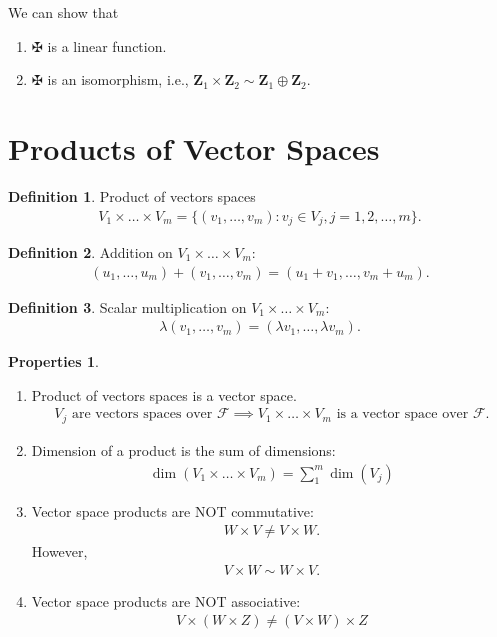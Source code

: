 \documentclass{book}
\theoremstyle{definition}
\newtheorem{defn}{Definition}[section]
\newtheorem{prop}{Properties}[section]
\newcommand{\F}{\mathcal{F}}
\newcommand{\Z}{\mathbf{Z}}
\begin{document}
We can show that
\begin{enumerate}
	\item $\maltese$ is a linear function. 
	
	\item $\maltese$ is an isomorphism, i.e., $\Z_1 \times \Z_2 \sim \Z_1 \oplus \Z_2$.
\end{enumerate}






\section{Products of Vector Spaces}




\begin{defn}
	Product of vectors spaces
	\begin{align*}
	V_1 \times\dots\times V_m = \{ (v_1,\dots,v_m): v_j \in V_j, j=1,2,\dots,m\}.
	\end{align*}
\end{defn}
\begin{defn}
	Addition on $V_1 \times\dots\times V_m$:
	\begin{align*}
	(u_1,\dots,u_m) + (v_1,\dots,v_m) = (u_1+v_1,\dots,v_m+u_m).
	\end{align*}
\end{defn}
\begin{defn}
	Scalar multiplication on $V_1 \times\dots\times V_m$:
	\begin{align*}
	\lambda(v_1,\dots,v_m) = (\lambda v_1,\dots,\lambda v_m).
	\end{align*}
\end{defn}
\begin{prop}
	$\,$
	\begin{enumerate}
		\item Product of vectors spaces is a vector space.
		\begin{align*}
		V_j \text{ are vectors spaces over } \F \implies V_1\times\dots\times V_m \text{ is a vector space over } \F.
		\end{align*}
		\item Dimension of a product is the sum of dimensions: 
		\begin{align*}
		\dim(V_1\times\dots\times V_m) = \sum_1^m\dim(V_j)
		\end{align*}
		\item Vector space products are NOT commutative:
		\begin{align*}
		W\times V \neq V\times W.
		\end{align*}
		However, 
		\begin{align*}
		V\times W \sim W \times V.
		\end{align*}
		\item Vector space products are NOT associative:
		\begin{align*}
		V\times(W\times Z) \neq (V\times W)\times Z
		\end{align*}
	\end{enumerate}
\end{prop}
\end{document}
